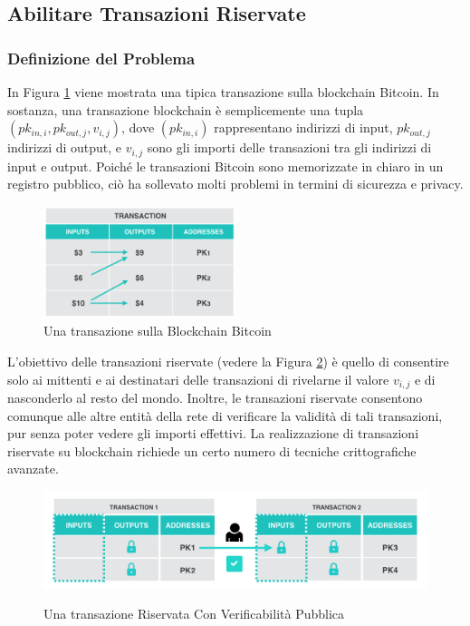 \subsection{Abilitare Transazioni Riservate}

\subsubsection{Definizione del Problema}
In Figura \ref{fig:fig4} viene mostrata una tipica transazione sulla blockchain Bitcoin. In sostanza, una transazione blockchain è semplicemente una tupla $({pk_{in,i}, {pk_{out,j},{v_{i,j}}}})$, dove $({pk_{in,i}})$ rappresentano indirizzi di input, ${pk_{out,j}}$ indirizzi di output, e ${v_{i,j}}$ sono gli importi delle transazioni tra gli indirizzi di input e output. Poiché le transazioni Bitcoin sono memorizzate in chiaro in un registro pubblico, ciò ha sollevato molti problemi in termini di sicurezza e privacy.

\begin{figure}[ht]
	\centering
	\includegraphics[width=0.5\textwidth]{Figura4.png}
	\caption{Una transazione sulla Blockchain Bitcoin}
	\label{fig:fig4}
\end{figure}

L'obiettivo delle transazioni riservate (vedere la Figura \ref{fig:fig5}) è quello di consentire solo ai mittenti e ai destinatari delle transazioni di rivelarne il valore ${v_{i,j}}$ e di nasconderlo al resto del mondo. Inoltre, le transazioni riservate consentono comunque alle altre entità della rete di verificare la validità di tali transazioni, pur senza poter vedere gli importi effettivi. La realizzazione di transazioni riservate su blockchain richiede un certo numero di tecniche crittografiche avanzate.

\begin{figure}[ht]
	\includegraphics[width=\textwidth]{Figura5.png}
	\label{fig:fig5}
	\caption{Una transazione Riservata Con Verificabilità Pubblica}
\end{figure}

